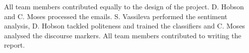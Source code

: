 
All team members contributed equally to the design of the project. D. Hobson and C. Moses processed the emails. S. Vassileva performed the sentiment analysis, D. Hobson tackled politeness and trained the classifiers and C. Moses analysed the discourse markers. All team members contributed to writing the report. 


%
%
%
%
